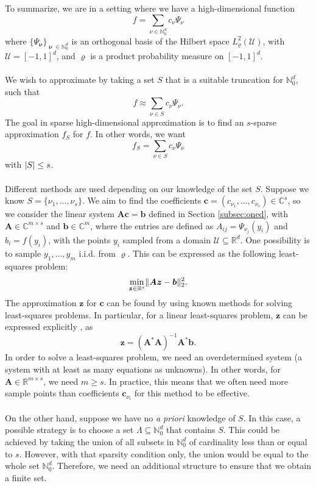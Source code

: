 \documentclass[12pt, oneside]{report}   	%
\newcommand{\R}{\mathbb{R}}
\newcommand{\C}{\mathbb{C}}
\newcommand{\N}{\mathbb{N}}
\DeclarePairedDelimiter{\abs}{\lvert}{\rvert}
\DeclarePairedDelimiter{\norm}{\lVert}{\rVert}        %
\DeclareMathOperator{\nuu}{\boldsymbol{\nu}}
\begin{document}
To summarize, we are in a setting where we have a high-dimensional function
$$
f=\sum_{\nu\in\N_0^d}c_{\nu}\Psi_{\nu}
$$
where $\{\Psi_{\nuu}\}_{\nuu\in\N_0^d}$ is an orthogonal basis of the Hilbert space $L_\varrho^2(\mathcal{U})$, with $\mathcal{U}=[-1,1]^d$, and $\varrho$ is a product probability measure on $[-1,1]^d$.\\\\
We wish to approximate by taking a set $S$ that is a suitable truncation for $\N_0^d$, such that
$$
f\approx\sum_{\nu\in S}c_{\nu}\Psi_{\nu}.
$$
The goal in sparse high-dimensional approximation is to find an $s$-sparse approximation $f_S$ for $f$. In other words, we want
$$
f_S = \sum_{\nu\in S}c_{\nu}\Psi_{\nu}
$$
with $\abs{S}\leq s$.\\\\
Different methods are used depending on our knowledge of the set $S$. Suppose we know $S=\{\nu_1,...,\nu_s\}$. We aim to find the coefficients $\boldsymbol{c}=(c_{\nu_1},...,c_{\nu_s})\in\C^s$, so we consider the linear system $\boldsymbol{A}\boldsymbol{c}=\boldsymbol{b}$ defined in Section \ref{subsec:oned}, with $\boldsymbol{A}\in\C^{m\times s}$ and $\boldsymbol{b}\in\C^m$, where the entries are defined as $A_{ij}=\Psi_{\nu_j}(y_i)$ and $b_i=f(y_i)$, with the points $y_i$ sampled from a domain $\mathcal{U}\subseteq\R^d$. One possibility is to sample $y_1, ..., y_m$ i.i.d. from $\varrho$. This can be expressed as the following least-squares problem:
$$
\min_{\boldsymbol{z}\in\R^s} \norm{\boldsymbol{A}\boldsymbol{z}-\boldsymbol{b}}_2^2.
$$
The approximation $\boldsymbol{z}$ for $\boldsymbol{c}$ can be found by using known methods for solving least-squares problems. In particular, for a linear least-squares problem, $\boldsymbol{z}$ can be expressed explicitly \cite{kutner2005applied}, as
$$
\boldsymbol{z}=(\boldsymbol{A}^*\boldsymbol{A})^{-1}\boldsymbol{A}^*\boldsymbol{b}.
$$
In order to solve a least-squares problem, we need an overdetermined system (a system with at least as many equations as unknowns). In other words, for $\boldsymbol{A}\in\R^{m\times s}$, we need $m\geq s$. In practice, this means that we often need more sample points than coefficients $\boldsymbol{c}_{\nu_i}$ for this method to be effective.\\\\
On the other hand, suppose we have no \emph{a priori} knowledge of $S$. In this case, a possible strategy is to choose a set $\Lambda\subseteq\N_0^d$ that contains $S$. This could be achieved by taking the union of all subsets in $\N^d_0$ of cardinality less than or equal to $s$. However, with that sparsity condition only, the union would be equal to the whole set $\N^d_0$. Therefore, we need an additional structure to ensure that we obtain a finite set.
\end{document}
